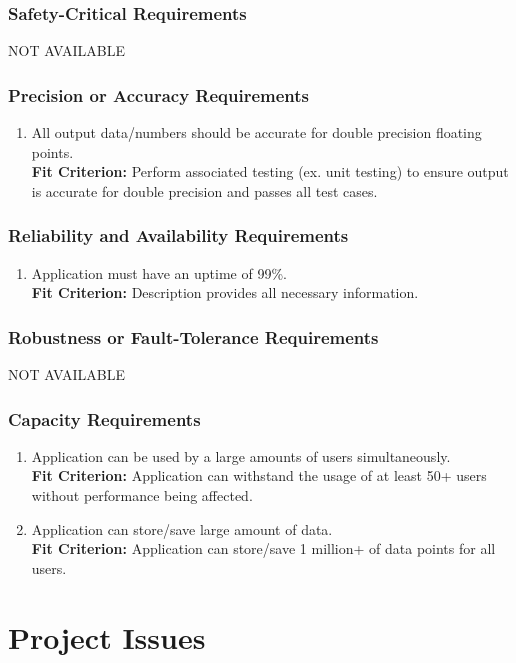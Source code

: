 \documentclass[12pt,letterpaper]{article}
\begin{document}
\subsubsection{Safety-Critical Requirements}
\noindent NOT AVAILABLE

\subsubsection{Precision or Accuracy Requirements}
\begin{enumerate}[resume*] 
    \item All output data/numbers should be accurate for double precision floating points.\\
    {\textbf{Fit Criterion:} Perform associated testing (ex. unit testing) to ensure output is accurate for double precision and passes all test cases. }
\end{enumerate}

\subsubsection{Reliability and Availability Requirements}
\begin{enumerate}[resume*] 
    \item Application must have an uptime of 99\%.\\
    {\textbf{Fit Criterion:} Description provides all necessary information. }
\end{enumerate}

\subsubsection{Robustness or Fault-Tolerance Requirements}
\noindent NOT AVAILABLE

\subsubsection{Capacity Requirements}
\begin{enumerate}[resume*] 
    \item Application can be used by a large amounts of users simultaneously.\\
    {\textbf{Fit Criterion:} Application can withstand the usage of at least 50+ users without performance being affected. }
    \item Application can store/save large amount of data.\\
    {\textbf{Fit Criterion:} Application can store/save 1 million+ of data points for all users. }
\end{enumerate}

\section{Project Issues}
\end{document}
